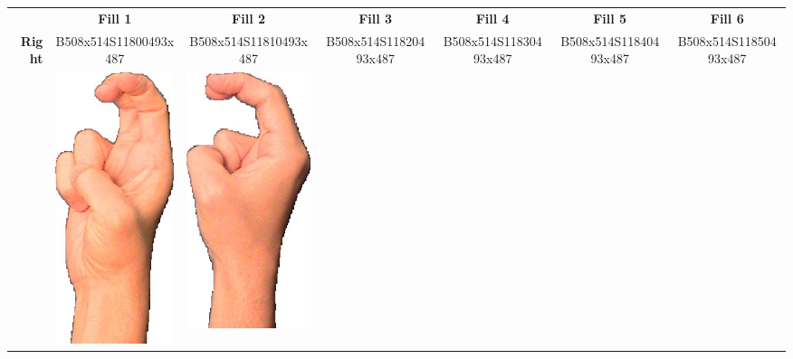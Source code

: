 \documentclass{article}
\begin{document}
\begin{center}
\begin{tabular}{r*{6}{c}}
&\textbf{Fill 1}&\textbf{Fill 2}&\textbf{Fill 3}&\textbf{Fill 4}&\textbf{Fill 5}&\textbf{Fill 6}\\
\multirow{2}{*}{\textbf{Right}}&
B508x514S11800493x487&
B508x514S11810493x487&
B508x514S11820493x487&
B508x514S11830493x487&
B508x514S11840493x487&
B508x514S11850493x487\\
&
\includegraphics[scale=0.1]{images/02-04-1.jpg}&
\includegraphics[scale=0.1]{images/02-04-2.jpg}&

\end{tabular}
\end{center}
\end{document}
